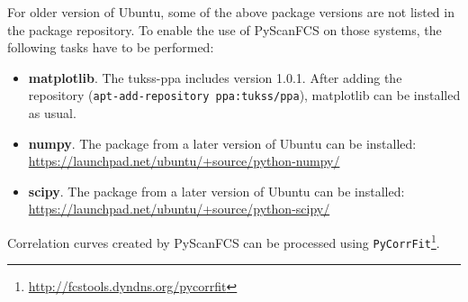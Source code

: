 \begin{itemize}
For older version of Ubuntu, some of the above package versions are not listed in the package repository. To enable the use of PyScanFCS on those systems, the following tasks have to be performed:

\begin{itemize}
\item[ ] \textbf{matplotlib}. The tukss-ppa includes version 1.0.1. After adding the repository (\texttt{apt-add-repository ppa:tukss/ppa}), matplotlib can be installed as usual.
\item[ ] \textbf{numpy}. The package from a later version of Ubuntu can be installed: \url{https://launchpad.net/ubuntu/+source/python-numpy/}
\item[ ] \textbf{scipy}. The package from a later version of Ubuntu can be installed: \url{https://launchpad.net/ubuntu/+source/python-scipy/}
\end{itemize}

\end{itemize}

Correlation curves created by PyScanFCS can be processed using \texttt{PyCorrFit}\footnote{\url{http://fcstools.dyndns.org/pycorrfit}}.

